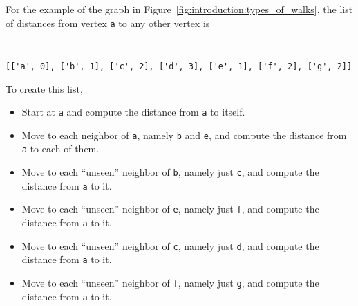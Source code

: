 For the example of the graph in
Figure~\ref{fig:introduction:types_of_walks}, the list of distances
from vertex \verb!a! to any other vertex is
%
\begin{center}
\fontsize{9pt}{9pt}
\selectfont
\tt
\begin{lstlisting}
[['a', 0], ['b', 1], ['c', 2], ['d', 3], ['e', 1], ['f', 2], ['g', 2]]
\end{lstlisting}
\end{center}
%
To create this list,
%
\begin{itemize}
\item
Start at \verb!a! and compute the distance from \verb!a! to itself.

\item
Move to each neighbor of \verb!a!, namely \verb!b! and \verb!e!, and
compute the distance from \verb!a! to each of them.

\item
Move to each ``unseen'' neighbor of \verb!b!, namely just \verb!c!,
and compute the distance from \verb!a! to it.

\item
Move to each ``unseen'' neighbor of \verb!e!, namely just \verb!f!,
and compute the distance from \verb!a! to it.

\item
Move to each ``unseen'' neighbor of \verb!c!, namely just \verb!d!,
and compute the distance from \verb!a! to it.

\item
Move to each ``unseen'' neighbor of \verb!f!, namely just \verb!g!,
and compute the distance from \verb!a! to it.
\end{itemize}

